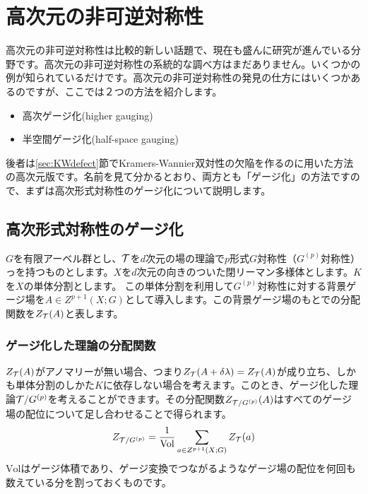 \documentclass[generalized_symmetry.tex]{subfiles}
\begin{document}
\chapter{高次元の非可逆対称性}
高次元の非可逆対称性は比較的新しい話題で、現在も盛んに研究が進んでいる分野です。高次元の非可逆対称性の系統的な調べ方はまだありません。いくつかの例が知られているだけです。高次元の非可逆対称性の発見の仕方にはいくつかあるのですが、ここでは２つの方法を紹介します。
\begin{itemize}
  \item 高次ゲージ化(higher gauging)
  \item 半空間ゲージ化(half-space gauging)
\end{itemize}
後者は\ref{sec:KWdefect}節でKramers-Wannier双対性の欠陥を作るのに用いた方法の高次元版です。名前を見て分かるとおり、両方とも「ゲージ化」の方法ですので、まずは高次形式対称性のゲージ化について説明します。

\section{高次形式対称性のゲージ化}
$G$を有限アーベル群とし、$\mathcal{T}$を$d$次元の場の理論で$p$形式$G$対称性（$G^{(p)}$対称性）っを持つものとします。$X$を$d$次元の向きのついた閉リーマン多様体とします。$K$を$X$の単体分割とします。
この単体分割を利用して$G^{(p)}$対称性に対する背景ゲージ場を$A\in Z^{p+1}(X;G)$として導入します。この背景ゲージ場のもとでの分配関数を$Z_{\mathcal{T}}(A)$と表します。

\subsection{ゲージ化した理論の分配関数}

$Z_{\mathcal{T}}(A)$がアノマリーが無い場合、つまり$Z_{\mathcal{T}}(A+\delta \lambda)=Z_{\mathcal{T}}(A)$が成り立ち、しかも単体分割のしかた$K$に依存しない場合を考えます。このとき、ゲージ化した理論$\mathcal{T}/G^{(p)}$を考えることができます。その分配関数$Z_{\mathcal{T}/G^{(p)}}(A)$はすべてのゲージ場の配位について足し合わせることで得られます。
\begin{align}
  Z_{\mathcal{T}/G^{(p)}} = \frac{1}{\mathrm{Vol}} \sum_{a \in Z^{p+1}(X;G)} Z_{\mathcal{T}}(a)
  \label{gaugingcochain}
\end{align}
$\mathrm{Vol}$はゲージ体積であり、ゲージ変換でつながるようなゲージ場の配位を何回も数えている分を割っておくものです。
\end{document}
